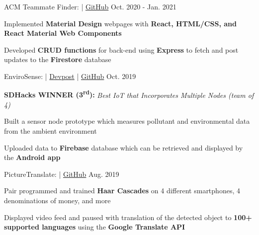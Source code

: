 

\begin{cventries}
	\cvproject
	{ACM Teammate Finder:  | \href{https://github.com/LelandTLong/ACM_Project}{\textcolor{awesome-skyblue}{\faGithub \enspace GitHub}}}
	{Oct. 2020 - Jan. 2021}
	{
		\begin{cvitems}
			\item Implemented \textbf{Material Design} webpages with \textbf{React, HTML/CSS, and React Material Web Components}
			\item Developed \textbf{CRUD functions} for back-end using \textbf{Express} to fetch and post updates to the \textbf{Firestore} database
		\end{cvitems}
	}

	\cvproject
	{EnviroSense:  | \href{https://devpost.com/software/envirosense}{\textcolor{awesome-skyblue}{Devpost}} | \href{https://github.com/jerukan/EnviroSense}{\textcolor{awesome-skyblue}{\faGithub \enspace GitHub}}}
	{Oct. 2019}
	{
		\begin{cvitems}
			\item \textbf{SDHacks WINNER (3\textsuperscript{rd}):} \textit{Best IoT that Incorporates Multiple Nodes (team of 4)}
			\item Built a sensor node prototype which measures pollutant and environmental data from the ambient environment
			\item Uploaded data to \textbf{Firebase} database which can be retrieved and displayed by the \textbf{Android app}
		\end{cvitems}
	}

	\cvproject
	{PictureTranslate:  |  \href{https://github.com/ucsd-cse-spis-2019/project-tristin-caroline}{\textcolor{awesome-skyblue}{\faGithub \enspace GitHub}}}
	{Aug. 2019}
	{
		\begin{cvitems}
			\item Pair programmed and trained \textbf{Haar Cascades} on 4 different smartphones, 4 denominations of money, and more
			\item Displayed video feed and paused with translation of the detected object to \textbf{100+ supported languages} using the \textbf{Google Translate API}
		\end{cvitems}
	}
\end{cventries}